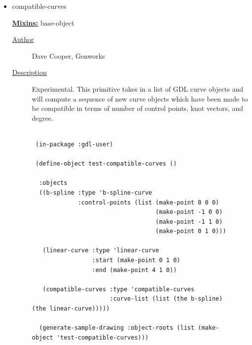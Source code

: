 \documentclass [11pt]{book}
\begin{document}
\begin{itemize}
\item {}compatible-curves


\textbf{
\underline{Mixins:}} base-object





\begin{description}

\item [
\underline{Author}]


Dave Cooper, Genworks



\item [
\underline{Description}]


Experimental. This primitive takes in a list of GDL 
curve objects and will compute a sequence of new curve objects which have been made 
to be compatible in terms of number of control points, knot vectors, and degree.



\end{description}




\begin{figure}
\begin{lrbox}{\boxedverb}
\begin{minipage}{\linewidth}
{\small

\begin{verbatim}
 
 (in-package :gdl-user)

 (define-object test-compatible-curves ()
  
  :objects
  ((b-spline :type 'b-spline-curve
             :control-points (list (make-point 0 0 0)
                                   (make-point -1 0 0)
                                   (make-point -1 1 0)
                                   (make-point 0 1 0)))
   
   (linear-curve :type 'linear-curve
                 :start (make-point 0 1 0)
                 :end (make-point 4 1 0))
   
   (compatible-curves :type 'compatible-curves
                      :curve-list (list (the b-spline) (the linear-curve)))))

  (generate-sample-drawing :object-roots (list (make-object 'test-compatible-curves)))



\end{verbatim}}
\end{minipage}
\end{lrbox}
\fbox{\usebox{\boxedverb}}


\end{figure}
\end{itemize}
\end{document}
